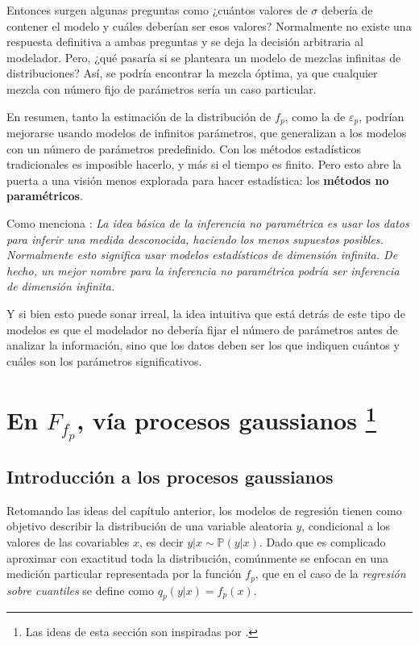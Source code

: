 Entonces surgen algunas preguntas como ¿cu\'antos valores de $\sigma$ deber\'ia de contener el modelo y cu\'ales deber\'ian ser esos valores? Normalmente no existe una respuesta definitiva a ambas preguntas y se deja la decisi\'on arbitraria al modelador. Pero, ¿qu\'e pasar\'ia si se planteara un modelo de mezclas infinitas de distribuciones? As\'i, se podr\'ia encontrar la mezcla \'optima, ya que cualquier mezcla con n\'umero fijo de par\'ametros ser\'ia un caso particular.

En resumen, tanto la estimaci\'on de la distribuci\'on de $f_p$, como la de $\varepsilon_p$, podr\'ian mejorarse usando modelos de infinitos par\'ametros, que generalizan a los modelos con un n\'umero de par\'ametros predefinido. Con los m\'etodos estad\'isticos tradicionales es imposible hacerlo, y m\'as si el tiempo es finito. Pero esto abre la puerta a una visi\'on menos explorada para hacer estad\'istica: los \textbf{m\'etodos no param\'etricos}.

Como menciona \cite{Wasserman_Nonparametric}: \textit{La idea b\'asica de la inferencia no param\'etrica es usar los datos para inferir una medida desconocida, haciendo los menos supuestos posibles. Normalmente esto significa usar modelos estad\'isticos de dimensi\'on infinita. De hecho, un mejor nombre para la inferencia no param\'etrica podr\'ia ser inferencia de dimensi\'on infinita.}

Y si bien esto puede sonar irreal, la idea intuitiva que est\'a detr\'as de este tipo de modelos es que el modelador no deber\'ia fijar el n\'umero de par\'ametros antes de analizar la informaci\'on, sino que los datos deben ser los que indiquen cu\'antos y cu\'ales son los par\'ametros significativos.

\section[En la distribuci\'on de $f_p$, v\'ia procesos gaussianos]{
    En $F_{f_p}$, v\'ia procesos gaussianos
    \footnote{Las ideas de esta secci\'on son inspiradas por \cite{Rasmussen_GauProc}.}
}

\subsection{Introducci\'on a los procesos gaussianos}

Retomando las ideas del cap\'itulo anterior, los modelos de regresi\'on tienen como objetivo describir la distribuci\'on de una variable aleatoria $y$, condicional a los valores de las covariables $x$, es decir $y|x \sim \mathbb{P}(y|x)$. Dado que es complicado aproximar con exactitud toda la distribuci\'on, com\'unmente se enfocan en una medici\'on particular representada por la funci\'on $f_p$, que en el caso de la \textit{regresi\'on sobre cuantiles} se define como $q_p(y|x) = f_p(x)$.

